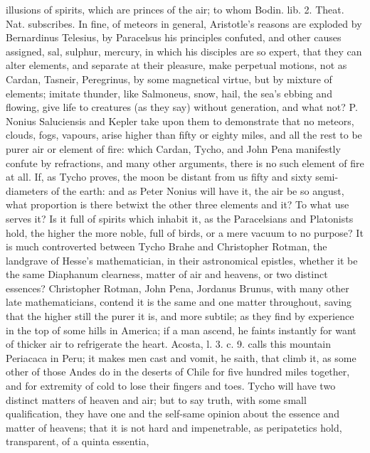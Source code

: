 {illusions of spirits, which are princes of the air; to whom Bodin. lib.
2. Theat. Nat. subscribes. In fine, of meteors in general, Aristotle's
reasons are exploded by Bernardinus Telesius, by Paracelsus his
principles confuted, and other causes assigned, sal, sulphur, mercury,
in which his disciples are so expert, that they can alter elements, and
separate at their pleasure, make perpetual motions, not as Cardan,
Tasneir, Peregrinus, by some magnetical virtue, but by mixture of
elements; imitate thunder, like Salmoneus, snow, hail, the sea's ebbing
and flowing, give life to creatures (as they say) without generation,
and what not? P. Nonius Saluciensis and Kepler take upon them to
demonstrate that no meteors, clouds, fogs, vapours, arise higher
than fifty or eighty miles, and all the rest to be purer air or element
of fire: which Cardan, Tycho, and John Pena
manifestly confute by refractions, and many other arguments, there is
no such element of fire at all. If, as Tycho proves, the moon be
distant from us fifty and sixty semi-diameters of the earth: and as
Peter Nonius will have it, the air be so angust, what proportion is
there betwixt the other three elements and it? To what use serves it?
Is it full of spirits which inhabit it, as the Paracelsians and
Platonists hold, the higher the more noble, full of birds, or a
mere vacuum to no purpose? It is much controverted between Tycho Brahe
and Christopher Rotman, the landgrave of Hesse's mathematician, in
their astronomical epistles, whether it be the same Diaphanum
clearness, matter of air and heavens, or two distinct essences?
Christopher Rotman, John Pena, Jordanus Brunus, with many other late
mathematicians, contend it is the same and one matter throughout,
saving that the higher still the purer it is, and more subtile; as they
find by experience in the top of some hills in America; if a man
ascend, he faints instantly for want of thicker air to refrigerate the
heart. Acosta, l. 3. c. 9. calls this mountain Periacaca in Peru; it
makes men cast and vomit, he saith, that climb it, as some other of
those Andes do in the deserts of Chile for five hundred miles together,
and for extremity of cold to lose their fingers and toes. Tycho will
have two distinct matters of heaven and air; but to say truth, with
some small qualification, they have one and the self-same opinion about
the essence and matter of heavens; that it is not hard and
impenetrable, as peripatetics hold, transparent, of a quinta essentia,
}
